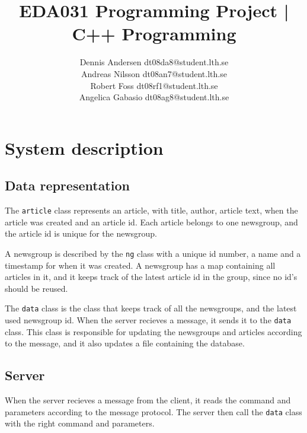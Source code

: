 \documentclass[12pt]{article}
\title{EDA031 Programming Project | C++ Programming}
\author{Dennis Andersen dt08da8@student.lth.se\\
Andreas Nilsson dt08an7@student.lth.se\\
Robert Foss dt08rf1@student.lth.se\\
Angelica Gabasio dt08ag8@student.lth.se}
\begin{document}
\maketitle
\newpage

\section{System description}

\subsection*{Data representation}
The \verb!article! class represents an article, with title, author, article text, when the article was created and an article id. Each article belongs to one newsgroup, and the article id is unique for the newsgroup.

A newsgroup is described by the \verb!ng! class with a unique id number, a name and a timestamp for when it was created. A newsgroup has a map containing all articles in it, and it keeps track of the latest article id in the group, since no id's should be reused.

The \verb!data! class is the class that keeps track of all the newsgroups, and the latest used newsgroup id. When the server recieves a message, it sends it to the \verb!data! class. This class is responsible for updating the newsgroups and articles according to the message, and it also updates a file containing the database.

\subsection*{Server}
When the server recieves a message from the client, it reads the command and parameters according to the message protocol. The server then call the \verb!data! class with the right command and parameters.
\end{document}
